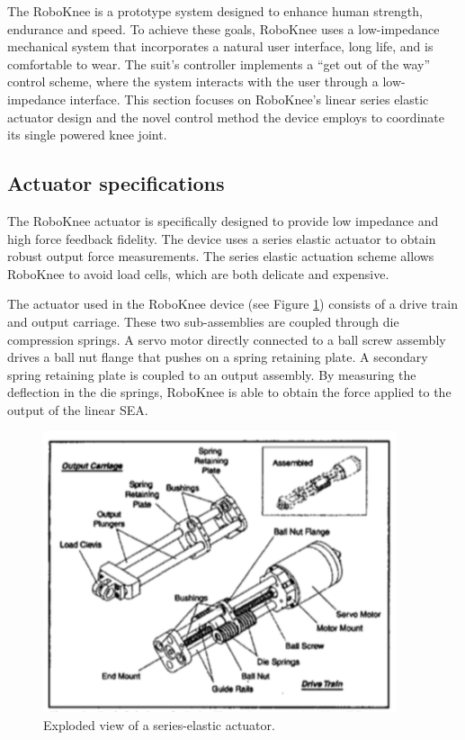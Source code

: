 \begin{refsection}


The RoboKnee is a prototype system designed to enhance human strength, endurance and speed.  To achieve these goals, RoboKnee uses a low-impedance mechanical system that incorporates a natural user interface, long life, and is comfortable to wear.  The suit's controller implements a ``get out of the way'' control scheme, where the system interacts with the user through a low-impedance interface.  This section focuses on RoboKnee's linear series elastic actuator design and the novel control method the device employs to coordinate its single powered knee joint.

\subsection{Actuator specifications}

The RoboKnee actuator is specifically designed to provide low impedance and high force feedback fidelity.  The device uses a series elastic actuator to obtain robust output force measurements.  The series elastic actuation scheme allows RoboKnee to avoid load cells, which are both delicate and expensive.

The actuator used in the RoboKnee device (see Figure \ref{fig:roboAct}) consists of a drive train and output carriage. These two sub-assemblies are coupled through die compression springs.  A servo motor directly connected to a ball screw assembly drives a ball nut flange that pushes on a spring retaining plate.  A secondary spring retaining plate is coupled to an output assembly.  By measuring the deflection in the die springs, RoboKnee is able to obtain the force applied to the output of the linear SEA.  
\begin{figure}[thpb]
\centering
\includegraphics[width=3.in]{exos/figs/roboKnee/roboSEA}
  \caption{Exploded view of a series-elastic actuator.}
 \label{fig:roboAct}   
 \end{figure}


\end{refsection}
